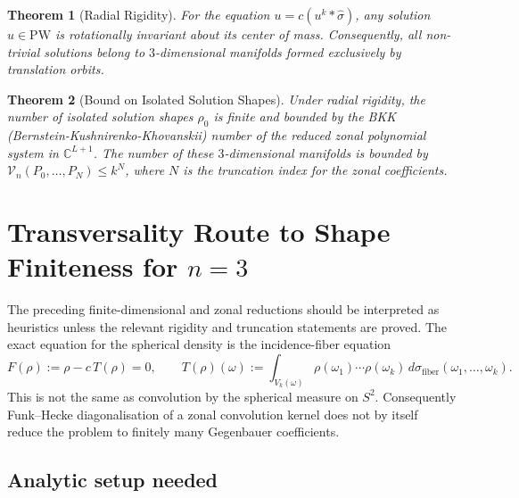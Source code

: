 \documentclass[12pt]{article}
\newtheorem{theorem}{Theorem}[section]
\newcommand{\PW}{\mathrm{PW}}
\begin{document}
\begin{theorem}[Radial Rigidity]
  For the equation $u = c(u^k \ast \hat{\sigma})$, any solution $u \in \PW$ is rotationally invariant about its center of mass. Consequently, all non-trivial solutions belong to $3$-dimensional manifolds formed exclusively by translation orbits. 
\end{theorem}

\begin{theorem}[Bound on Isolated Solution Shapes]
  Under radial rigidity, the number of isolated solution shapes $\rho_0$ is finite and bounded by the BKK (Bernstein-Kushnirenko-Khovanskii) number of the reduced zonal polynomial system in $\mathbb{C}^{L+1}$. The number of these $3$-dimensional manifolds is bounded by $\mathcal{V}_n(P_0, \dots, P_N) \leq k^N$, where $N$ is the truncation index for the zonal coefficients.
\end{theorem}

\section{\texorpdfstring{Transversality Route to Shape Finiteness for $n=3$}{Transversality Route to Shape Finiteness for n=3}}

The preceding finite-dimensional and zonal reductions should be interpreted as
heuristics unless the relevant rigidity and truncation statements are proved.
The exact equation for the spherical density is the incidence-fiber equation
\[
  F(\rho) := \rho - c\,T(\rho) = 0,\qquad
  T(\rho)(\omega)
    := \int_{V_k(\omega)} \rho(\omega_1)\cdots\rho(\omega_k)\,
       d\sigma_{\mathrm{fiber}}(\omega_1,\ldots,\omega_k).
\]
This is not the same as convolution by the spherical measure on $S^2$.
Consequently Funk--Hecke diagonalisation of a zonal convolution kernel does
not by itself reduce the problem to finitely many Gegenbauer coefficients.

\subsection{Analytic setup needed}
\end{document}
